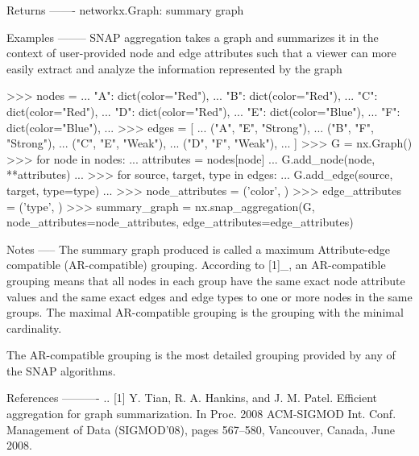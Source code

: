 \begin{DoxyVerb}
Returns
-------
networkx.Graph: summary graph

Examples
--------
SNAP aggregation takes a graph and summarizes it in the context of user-provided
node and edge attributes such that a viewer can more easily extract and
analyze the information represented by the graph

>>> nodes = {
...     "A": dict(color="Red"),
...     "B": dict(color="Red"),
...     "C": dict(color="Red"),
...     "D": dict(color="Red"),
...     "E": dict(color="Blue"),
...     "F": dict(color="Blue"),
... }
>>> edges = [
...     ("A", "E", "Strong"),
...     ("B", "F", "Strong"),
...     ("C", "E", "Weak"),
...     ("D", "F", "Weak"),
... ]
>>> G = nx.Graph()
>>> for node in nodes:
...     attributes = nodes[node]
...     G.add_node(node, **attributes)
...
>>> for source, target, type in edges:
...     G.add_edge(source, target, type=type)
...
>>> node_attributes = ('color', )
>>> edge_attributes = ('type', )
>>> summary_graph = nx.snap_aggregation(G, node_attributes=node_attributes, edge_attributes=edge_attributes)

Notes
-----
The summary graph produced is called a maximum Attribute-edge
compatible (AR-compatible) grouping.  According to [1]_, an
AR-compatible grouping means that all nodes in each group have the same
exact node attribute values and the same exact edges and
edge types to one or more nodes in the same groups.  The maximal
AR-compatible grouping is the grouping with the minimal cardinality.

The AR-compatible grouping is the most detailed grouping provided by
any of the SNAP algorithms.

References
----------
.. [1] Y. Tian, R. A. Hankins, and J. M. Patel. Efficient aggregation
   for graph summarization. In Proc. 2008 ACM-SIGMOD Int. Conf.
   Management of Data (SIGMOD’08), pages 567–580, Vancouver, Canada,
   June 2008.
\end{DoxyVerb}
 
